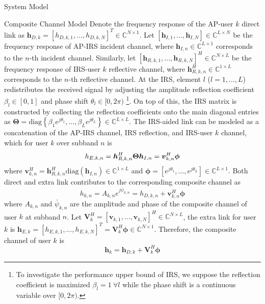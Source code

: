 \documentclass{IEEEtran}
\begin{document}
\begin{section}{System Model}
	\begin{subsection}{Composite Channel Model}
		Denote the frequency response of the AP-user $k$ direct link as $\boldsymbol{h}_{D,k}=[h_{D,k,1},\dots,h_{D,k,N}]^T \in \mathbb{C}^{N \times 1}$. Let $[\boldsymbol{h}_{I,1},\dots,\boldsymbol{h}_{I,N}] \in \mathbb{C}^{L \times N}$ be the frequency response of AP-IRS incident channel, where $\boldsymbol{h}_{I,n} \in \mathbb{C}^{L \times 1}$ corresponds to the $n$-th incident channel. Similarly, let $[\boldsymbol{h}_{R,k,1},\dots,\boldsymbol{h}_{R,k,N}]^H \in \mathbb{C}^{N \times L}$ be the frequency response of IRS-user $k$ reflective channel, where $\boldsymbol{h}_{R,k,n}^H \in \mathbb{C}^{1 \times L}$ corresponds to the $n$-th reflective channel. At the IRS, element $l$ ($l=1,\dots,L$) redistributes the received signal by adjusting the amplitude reflection coefficient $\beta_l \in [0,1]$ and phase shift $\theta_l \in [0,2\pi)$ \footnote{To investigate the performance upper bound of IRS, we suppose the reflection coefficient is maximized $\beta_l=1 \ \forall l$ while the phase shift is a continuous variable over $[0,2\pi)$.}. On top of this, the IRS matrix is constructed by collecting the reflection coefficients onto the main diagonal entries as $\boldsymbol{\Theta} = \mathrm{diag}\left\{\beta_1 e^{j \theta_1}, \dots, \beta_L e^{j \theta_L}\right\} \in \mathbb{C}^{L \times L}$. The IRS-aided link can be modeled as a concatenation of the AP-IRS channel, IRS reflection, and IRS-user $k$ channel, which for user $k$ over subband $n$ is
		\begin{equation}\label{eq:h_{E,k,n}}
			h_{E,k,n} = \boldsymbol{h}_{R,k,n}^H \boldsymbol{\Theta} \boldsymbol{h}_{I,n} = \boldsymbol{v}_{k,n}^H \boldsymbol{\phi}
		\end{equation}
		where $\boldsymbol{v}_{k,n}^H=\boldsymbol{h}_{R,k,n}^H \mathrm{diag}(\boldsymbol{h}_{I,n}) \in \mathbb{C}^{1 \times L}$ and $\boldsymbol{\phi}=[e^{j{\theta_1}},\dots,e^{j{\theta_L}}] \in \mathbb{C}^{L \times 1}$. Both direct and extra link contributes to the corresponding composite channel as
		\begin{equation}
			h_{k,n} = A_{k,n} e^{j\bar{\psi}_{k,n}}= h_{D,k,n} + \boldsymbol{v}_{k,n}^H \boldsymbol{\phi}
		\end{equation}
		where $A_{k,n}$ and $\bar{\psi}_{k,n}$ are the amplitude and phase of the composite channel of user $k$ at subband $n$. Let $\boldsymbol{V}_k^H=[\boldsymbol{v}_{k,1},\dots,\boldsymbol{v}_{k,N}]^H \in \mathbb{C}^{N \times L}$, the extra link for user $k$ is $\boldsymbol{h}_{E,k}=[h_{E,k,1},\dots,h_{E,k,N}]^T=\boldsymbol{V}_k^H \boldsymbol{\phi} \in \mathbb{C}^{N \times 1}$. Therefore, the composite channel of user $k$ is
		\begin{equation}\label{eq:h_k}
			\boldsymbol{h}_k = \boldsymbol{h}_{D,k} + \boldsymbol{V}_k^H \boldsymbol{\phi}
		\end{equation}
	\end{subsection}


\end{section}
\end{document}
